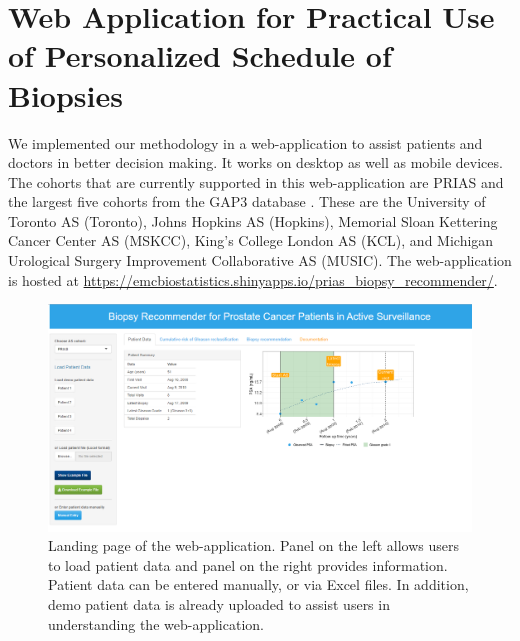 \section{Web Application for Practical Use of Personalized Schedule of Biopsies}

We implemented our methodology in a web-application to assist patients and doctors in better decision making. It works on desktop as well as mobile devices. The cohorts that are currently supported in this web-application are PRIAS and the largest five cohorts from the GAP3 database \citep{gap3_2018}. These are the University of Toronto AS (Toronto), Johns Hopkins AS (Hopkins), Memorial Sloan Kettering Cancer Center AS (MSKCC), King's College London AS (KCL), and Michigan Urological Surgery Improvement Collaborative AS (MUSIC). The web-application is hosted at \url{https://emcbiostatistics.shinyapps.io/prias_biopsy_recommender/}. 

\begin{figure}[!htb]
\centerline{\includegraphics[width=\columnwidth]{images/app/landing_page.png}}
\caption{Landing page of the web-application. Panel on the left allows users to load patient data and panel on the right provides information. Patient data can be entered manually, or via Excel files. In addition, demo patient data is already uploaded to assist users in understanding the web-application.}
\label{fig:landing_page}
\end{figure}